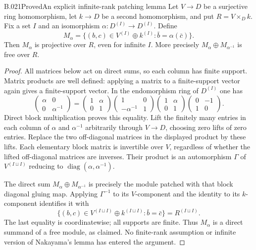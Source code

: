 \begin{saresult}{B.021}{Proved}{An explicit infinite-rank patching lemma}
Let $V\to D$ be a surjective ring homomorphism, let $k\to D$ be a
second homomorphism, and put $R=V\times_D k$. Fix a set $I$ and an
isomorphism $\alpha:D^{(I)}\to D^{(I)}$. Define
\[
 M_\alpha=\{(b,c)\in V^{(I)}\oplus k^{(I)}:
                  \bar b=\alpha(\bar c)\}.
\]
Then $M_\alpha$ is projective over $R$, even for infinite $I$.
More precisely $M_\alpha\oplus M_{\alpha^{-1}}$ is free over $R$.
\end{saresult}
\begin{proof}
All matrices below act on direct sums, so each column has finite
support. Matrix products are well defined: applying a matrix to a
finite-support vector again gives a finite-support vector.
In the endomorphism ring of $D^{(I)}$ one has
\[
 \begin{pmatrix}\alpha&0\\0&\alpha^{-1}\end{pmatrix}
 =
 \begin{pmatrix}1&\alpha\\0&1\end{pmatrix}
 \begin{pmatrix}1&0\\-\alpha^{-1}&1\end{pmatrix}
 \begin{pmatrix}1&\alpha\\0&1\end{pmatrix}
 \begin{pmatrix}0&-1\\1&0\end{pmatrix}.
\]
Direct block multiplication proves this equality. Lift the finitely
many entries in each column of $\alpha$ and $\alpha^{-1}$ arbitrarily
through $V\to D$, choosing zero lifts of zero entries. Replace the
two off-diagonal matrices in the displayed product by these lifts.
Each elementary block matrix is invertible over $V$, regardless of
whether the lifted off-diagonal matrices are inverses. Their product
is an automorphism $\Gamma$ of $V^{(I\sqcup I)}$ reducing to
$\operatorname{diag}(\alpha,\alpha^{-1})$.

The direct sum $M_\alpha\oplus M_{\alpha^{-1}}$ is precisely the
module patched with that block diagonal gluing map. Applying
$\Gamma^{-1}$ to its $V$-component and the identity to its
$k$-component identifies it with
\[
 \{(b,c)\in V^{(I\sqcup I)}\oplus k^{(I\sqcup I)}:
                       \bar b=\bar c\}=R^{(I\sqcup I)}.
\]
The last equality is coordinatewise; all supports are finite.
Thus $M_\alpha$ is a direct summand of a free module, as claimed.
No finite-rank assumption or infinite version of Nakayama's lemma
has entered the argument.
\end{proof}

